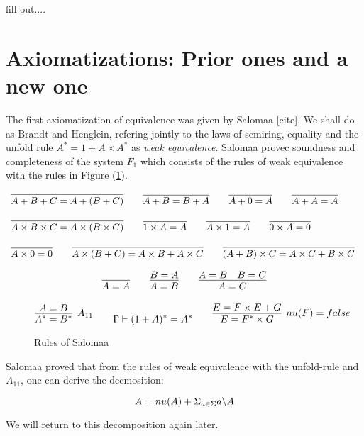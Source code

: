 \documentclass[a4paper,UKenglish,cleveref, autoref, thm-restate]{lipics-v2021}
\begin{document}
\begin{definition}
  fill out....
\end{definition}
\section{Axiomatizations:  Prior ones and a new one}
The first axiomatization of equivalence was given by Salomaa [cite]. We shall do as Brandt and Henglein, refering jointly to the laws of semiring, equality and the unfold rule $A^* = 1 + A \times A^*$ as \textit{weak equivalence}. Salomaa provec soundness and completeness of the system $F_1$ which consists of the rules of weak equivalence with the rules in Figure (\ref{fig:salomaa}).
\begin{definition}
\label{definition:ring}
\begin{displaymath}
\begin{array}{lll}
\myaxiom{A + B + C}{A + (B + C)} \qquad  
\myaxiom{A + B}{B + A} \qquad 
\myaxiom{A + 0}{A} \qquad
\myaxiom{A + A}{A} \qquad
\\\\
\myaxiom{A \times B \times C}{A \times (B \times C)} \qquad
\myaxiom{1 \times A}{A} \qquad
\myaxiom{A \times 1}{A} \qquad 
\myaxiom{0 \times A}{0} \qquad
\\\\
\myaxiom{A \times 0}{0} \qquad
\myaxiom{A \times (B + C)} {A \times B + A \times C} \qquad
\myaxiom{(A + B)\times C}{A \times C + B \times C}
\end{array}
\end{displaymath}
\end{definition}

\begin{definition}
\label{definition:equality}
\begin{displaymath}
\begin{array}{lll}
\infer{A = A}{}\qquad
\infer{A = B}{B = A}\qquad
\infer{A = C}{A = B & B = C}
\end{array}
\end{displaymath}
\end{definition}
\begin{figure}
\caption{Rules of Salomaa}
\label{fig:salomaa}
\begin{displaymath}
\infer[A_{11}]{\eqBodyE{A^*}{B^*}}
  {\eqBodyE{A}{B}} \qquad
\myaxiomN{(1 + A)^*}{A^*} \qquad \infer[\mynu{F}=\false]{\eqBodyE{E}{F^* \times G}}{\eqBodyE{E}{F \times E + G}}
\end{displaymath}
\end{figure}
Salomaa proved that from the rules of weak equivalence with the unfold-rule and $A_{11}$, one can derive the decmosition:
\begin{lemma} \label{lem:salomaa}
\[A = \mynu{A} + \Sigma_{a \in \Sigma} \derive{a}{A}\]
\end{lemma}
We will return to this decomposition again later.
\end{document}
